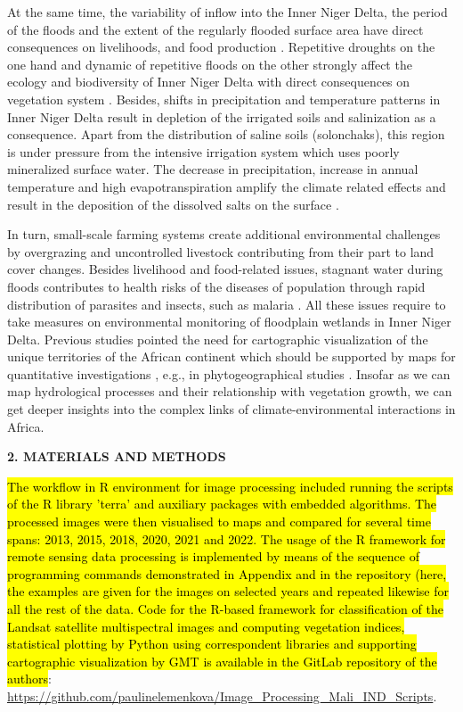 \documentclass[12pt,a4paper,oneside]{article}
\def \newsection{\vspace{12pt}\textbf}
\def \newpar{\vspace{6pt}}
\begin{document}
\newpar At the same time, the variability of inflow into the Inner Niger Delta, the period of the floods and the extent of the regularly flooded surface area have direct consequences on livelihoods, and food production \citep{LIERSCH201318}. Repetitive droughts on the one hand and dynamic of repetitive floods on the other strongly affect the ecology and biodiversity of Inner Niger Delta with direct consequences on vegetation system \citep{mariko2003caracterisation}. Besides, shifts in precipitation and temperature patterns in Inner Niger Delta result in depletion of the irrigated soils and salinization as a consequence. Apart from the distribution of saline soils (solonchaks), this region is under pressure from the intensive irrigation system which uses poorly mineralized surface water. The decrease in precipitation, increase in annual temperature and high evapotranspiration amplify the climate related effects and result in the deposition of the dissolved salts on the surface \citep{Valenza}. 

\newpar In turn, small-scale farming systems create additional environmental challenges by overgrazing and uncontrolled livestock contributing from their part to land cover changes. Besides livelihood and food-related issues, stagnant water during floods contributes to health risks of the diseases of population through rapid distribution of parasites and insects, such as malaria \citep{COOLS201334,Klinkenberg}. All these issues require to take measures on environmental monitoring of floodplain wetlands in Inner Niger Delta. Previous studies pointed the need for cartographic visualization of the unique territories of the African continent which should be supported by maps for quantitative investigations \citep{Cabot1968}, e.g., in phytogeographical studies \citep{Robequain}. Insofar as we can map hydrological processes and their relationship with vegetation growth, we can get deeper insights into the complex links of climate-environmental interactions in Africa.

\newsection {2. MATERIALS AND METHODS}

\hl{The workflow in R environment for image processing included running the scripts of the R library 'terra' and auxiliary packages with embedded algorithms. The processed images were then visualised to maps and compared for several time spans: 2013, 2015, 2018, 2020, 2021 and 2022. The usage of the R framework for remote sensing data processing is implemented by means of the sequence of programming commands demonstrated in Appendix and in the repository (here, the examples are given for the images on selected years and repeated likewise for all the rest of the data. Code for the R-based framework for classification of the Landsat satellite multispectral images and computing vegetation indices, statistical plotting by Python using correspondent libraries and supporting cartographic visualization by GMT is available in the GitLab repository of the authors}: \href{https://github.com/paulinelemenkova/Image_Processing_Mali_IND_Scripts}{https://github.com/paulinelemenkova/Image\_Processing\_Mali\_IND\_Scripts}.
\end{document}
